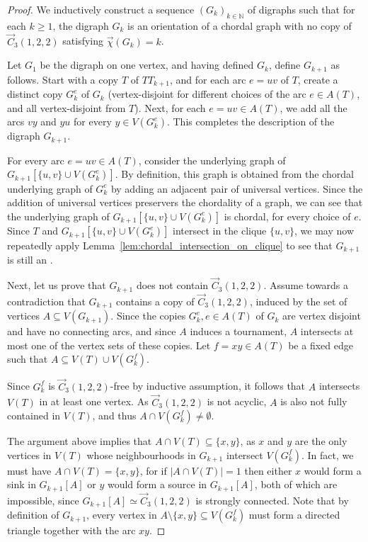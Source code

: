 \begin{proof}
We inductively construct a sequence $(G_k)_{k \in \mathbb{N}}$ of digraphs such that for each $k \ge 1$, the digraph $G_k$ is an orientation of a chordal graph with no copy of $\vec C_{3}(1,2,2)$ satisfying $\vec{\chi}(G_k)=k$.

Let $G_1$ be the digraph on one vertex, and having defined $G_{k}$, define $G_{k+1}$ as follows. 
Start with a copy $T$ of $TT_{k+1}$, and for each arc $e=uv$ of $T$, create a distinct copy $G_{k}^e$ of $G_{k}$ (vertex-disjoint for different choices of the arc $e \in A(T)$, and all vertex-disjoint from $T$). Next, for each $e=uv \in A(T)$, we add all the arcs $vy$ and $yu$ for every $y \in V(G_k^e)$.  
This completes the description of the digraph $G_{k+1}$.

For every arc $e=uv \in A(T)$, consider the underlying graph of $G_{k+1}[\{u,v\} \cup V(G_k^e)]$. By definition, this graph is obtained from the chordal underlying graph of $G_k^e$ by adding an adjacent pair of universal vertices. Since the addition of universal vertices preservers the chordality of a graph, we can see that the underlying graph of $G_{k+1}[\{u,v\} \cup V(G_k^e)]$ is chordal, for every choice of $e$. Since $T$ and $G_{k+1}[\{u,v\} \cup V(G_k^e)]$ intersect in  the clique $\{u,v\}$, we may now repeatedly apply Lemma~\ref{lem:chordal_intersection_on_clique} to see that $G_{k+1}$ is still an \ocg.

Next, let us prove that $G_{k+1}$ does not contain $\vec C_{3}(1,2,2)$. Assume towards a contradiction that $G_{k+1}$ contains a copy of $\vec C_{3}(1,2,2)$, induced by the set of vertices $A \subseteq V(G_{k+1})$. Since the copies $G_{k}^e, e \in A(T)$ of $G_k$ are vertex disjoint and have no connecting arcs, and since $A$ induces a tournament, $A$ intersects at most one of the vertex sets of these copies. Let $f=xy \in A(T)$ be a fixed edge such that $A \subseteq V(T) \cup V(G_k^f)$. 

Since $G_k^f$ is $\vec C_{3}(1,2,2)$-free by inductive assumption, it follows that $A$ intersects $V(T)$ in at least one vertex. 
As $\vec C_{3}(1,2,2)$ is not acyclic, $A$ is also not fully contained in $V(T)$, and thus $A \cap V(G_k^f) \neq \emptyset$. 

The argument above implies that $A \cap V(T) \subseteq \{x,y\}$, as $x$ and $y$ are the only vertices in $V(T)$ whose neighbourhoods in $G_{k+1}$ intersect $V(G_k^f)$. 
In fact, we must have $A \cap V(T)=\{x,y\}$, for if $|A\cap V(T)|=1$ then either $x$ would form a sink in $G_{k+1}[A]$ or $y$ would form a source in $G_{k+1}[A]$, both of which are impossible, since $G_{k+1}[A] \simeq \vec C_{3}(1,2,2)$ is strongly connected. Note that by definition of $G_{k+1}$, every vertex in $A \setminus \{x,y\} \subseteq V(G_k^f)$ must form a directed triangle together with the arc $xy$. 


\end{proof}
